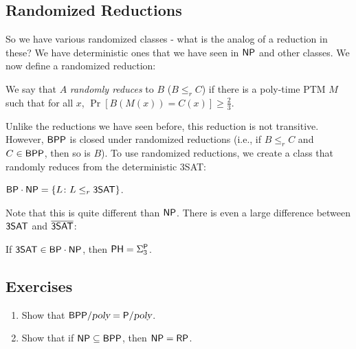\subsection{Randomized Reductions}
So we have various randomized classes - what is the analog of a reduction in these? We have deterministic ones that we have seen in ${\mathsf{NP}}$ and other classes. We now define a randomized reduction:
\begin{definition}
We say that $A$ \emph{randomly reduces} to $B$ ($B \le_r C$) if there is a poly-time PTM $M$ such that for all $x$, $\Pr[B(M(x)) = C(x)] \ge \frac{2}{3}$. 
\end{definition}
Unlike the reductions we have seen before, this reduction is not transitive. However, ${\mathsf{BPP}}$ is closed under randomized reductions (i.e., if $B \le_r C$ and $C \in {\ensuremath{\mathsf{BPP}}}$, then so is $B$). To use randomized reductions, we create a class that randomly reduces from the deterministic 3SAT:
\begin{definition}
${\mathsf{BP}}\cdot {\ensuremath{\mathsf{NP}}} = \{L \colon L \le_r {\mathsf{3SAT}}\}$. 
\end{definition}
Note that this is quite different than ${\mathsf{NP}}$. There is even a large difference between ${\mathsf{3SAT}}$ and $\overline{{\mathsf{3SAT}}}$:
\begin{theorem}
If ${\mathsf{3SAT}} \in {\ensuremath{\mathsf{BP}}}\cdot {\ensuremath{\mathsf{NP}}}$, then ${\mathsf{PH}} = \Sigma_3^{\mathsf{P}}$. 
\end{theorem}  

\subsection*{Exercises}
\newcommand{\BPPpoly}{\BPP/\poly}
\begin{enumerate}
\item Show that $\BPPpoly = \Ppoly$. %
\item Show that if ${\mathsf{NP}} \subseteq {\ensuremath{\mathsf{BPP}}}$, then ${\mathsf{NP}} = {\mathsf{RP}}$. %
\end{enumerate}